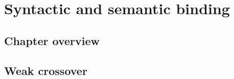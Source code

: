 \documentclass[a4paper]{article}
\begin{document}
\section{Syntactic and semantic binding}

\subsection{Chapter overview}

\subsection{Weak crossover}
\end{document}
